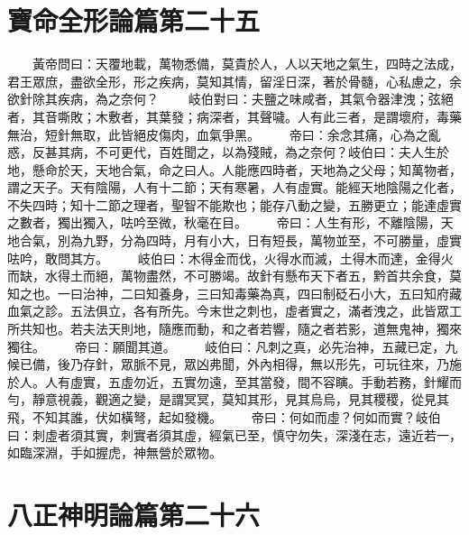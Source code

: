 \section{寶命全形論篇第二十五}

　　黃帝問曰：天覆地載，萬物悉備，莫貴於人，人以天地之氣生，四時之法成，君王眾庶，盡欲全形，形之疾病，莫知其情，留淫日深，著於骨髓，心私慮之，余欲針除其疾病，為之奈何？
　　岐伯對曰：夫鹽之味咸者，其氣令器津洩；弦絕者，其音嘶敗；木敷者，其葉發；病深者，其聲噦。人有此三者，是謂壞府，毒藥無治，短針無取，此皆絕皮傷肉，血氣爭黑。
　　帝曰：余念其痛，心為之亂惑，反甚其病，不可更代，百姓聞之，以為殘賊，為之奈何？岐伯曰：夫人生於地，懸命於天，天地合氣，命之曰人。人能應四時者，天地為之父母；知萬物者，謂之天子。天有陰陽，人有十二節；天有寒暑，人有虛實。能經天地陰陽之化者，不失四時；知十二節之理者，聖智不能欺也；能存八動之變，五勝更立；能達虛實之數者，獨出獨入，呿吟至微，秋毫在目。
　　帝曰：人生有形，不離陰陽，天地合氣，別為九野，分為四時，月有小大，日有短長，萬物並至，不可勝量，虛實呿吟，敢問其方。
　　岐伯曰：木得金而伐，火得水而滅，土得木而達，金得火而缺，水得土而絕，萬物盡然，不可勝竭。故針有懸布天下者五，黔首共余食，莫知之也。一曰治神，二曰知養身，三曰知毒藥為真，四曰制砭石小大，五曰知府藏血氣之診。五法俱立，各有所先。今末世之刺也，虛者實之，滿者洩之，此皆眾工所共知也。若夫法天則地，隨應而動，和之者若響，隨之者若影，道無鬼神，獨來獨往。
　　帝曰：願聞其道。
　　岐伯曰：凡刺之真，必先治神，五藏已定，九候已備，後乃存針，眾脈不見，眾凶弗聞，外內相得，無以形先，可玩往來，乃施於人。人有虛實，五虛勿近，五實勿遠，至其當發，間不容瞚。手動若務，針耀而勻，靜意視義，觀適之變，是謂冥冥，莫知其形，見其烏烏，見其稷稷，從見其飛，不知其誰，伏如橫弩，起如發機。
　　帝曰：何如而虛？何如而實？岐伯曰：刺虛者須其實，刺實者須其虛，經氣已至，慎守勿失，深淺在志，遠近若一，如臨深淵，手如握虎，神無營於眾物。


\section{八正神明論篇第二十六}

